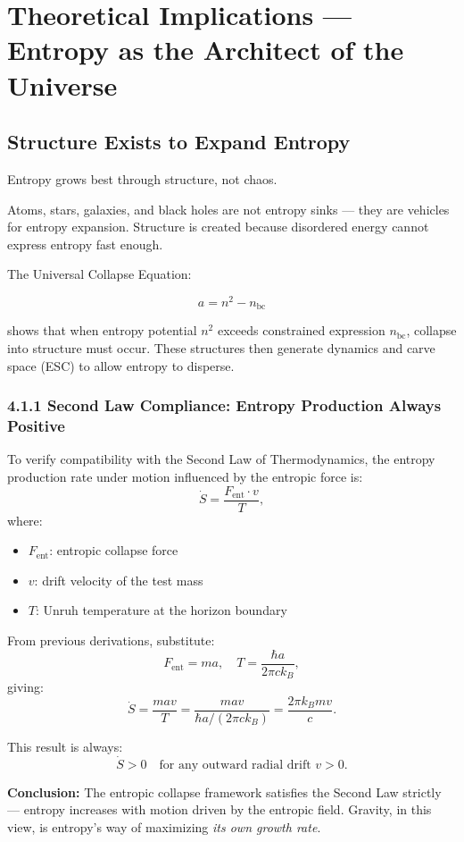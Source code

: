 \documentclass[12pt]{article}
\begin{document}
\section{Theoretical Implications — Entropy as the Architect of the Universe}

\subsection{Structure Exists to Expand Entropy}

Entropy grows best through structure, not chaos.

Atoms, stars, galaxies, and black holes are not entropy sinks — they are vehicles for entropy expansion. Structure is created because disordered energy cannot express entropy fast enough.

The Universal Collapse Equation:

\[
a = n^2 - n_{\text{bc}}
\]

shows that when entropy potential $n^2$ exceeds constrained expression $n_{\text{bc}}$, collapse into structure must occur. These structures then generate dynamics and carve space (ESC) to allow entropy to disperse.

\subsubsection*{4.1.1 Second Law Compliance: Entropy Production Always Positive}

To verify compatibility with the Second Law of Thermodynamics, the entropy production rate under motion influenced by the entropic force is:
\[
\dot{S} = \frac{F_{\text{ent}} \cdot v}{T},
\]
where:
\begin{itemize}
    \item \( F_{\text{ent}} \): entropic collapse force
    \item \( v \): drift velocity of the test mass
    \item \( T \): Unruh temperature at the horizon boundary
\end{itemize}

From previous derivations, substitute:
\[
F_{\text{ent}} = m a, \quad T = \frac{\hbar a}{2\pi c k_B},
\]
giving:
\[
\dot{S} = \frac{m a v}{T} = \frac{m a v}{\hbar a/(2\pi c k_B)} = \frac{2\pi k_B m v}{c}.
\]

This result is always:
\[
\dot{S} > 0 \quad \text{for any outward radial drift } v > 0.
\]

\textbf{Conclusion:} The entropic collapse framework satisfies the Second Law strictly — entropy increases with motion driven by the entropic field. Gravity, in this view, is entropy’s way of maximizing \emph{its own growth rate}.
\end{document}
